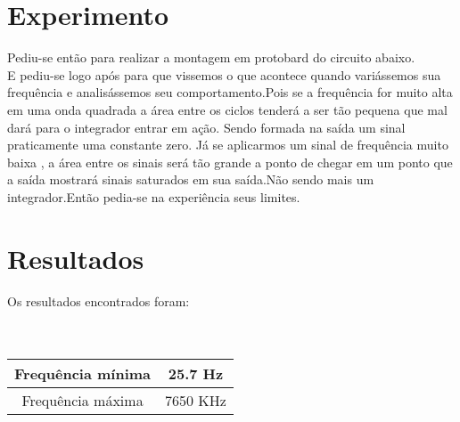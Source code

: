 \documentclass[11pt]{article}
\begin{document}
 \section{Experimento }
 Pediu-se então para realizar a montagem em protobard do circuito abaixo.\\

 E pediu-se logo após para que vissemos o que acontece quando variássemos sua frequência e analisássemos seu comportamento.Pois se a frequência for muito alta em uma onda quadrada a área entre os ciclos tenderá a ser tão pequena que mal dará para  o integrador entrar em ação. Sendo formada na saída um sinal praticamente uma constante zero. Já se aplicarmos um sinal de frequência muito baixa , a área entre os sinais será tão grande a ponto de chegar em um ponto que a saída mostrará sinais saturados em sua saída.Não sendo mais um integrador.Então pedia-se na experiência seus limites.\\
 \section{Resultados}
 Os resultados encontrados foram:\\\\\\
 \begin{tabular}{|c|c|}
\hline 
 Frequência mínima & 25.7 Hz\\
 \hline
 Frequência máxima & 7650 KHz\\
 \hline
\end{tabular}  
\end{document}
